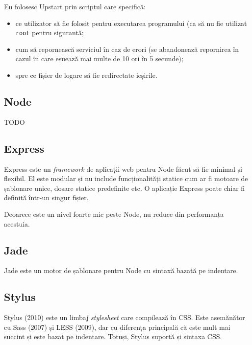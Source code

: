\documentclass[a4wide,12pt]{report}
\newcommand{\eng}[1]{\emph{#1}} %
\newcommand{\cod}[1]{\texttt{#1}}
\newcommand{\idee}[1]{{\color{red} #1}}
\begin{document}
Eu folosesc Upstart prin scriptul care specifică:

\begin{itemize}

\item ce utilizator să fie folosit pentru executarea programului (ca să nu fie
utilizat \cod{root} pentru sigurantă;

\item cum să repornească serviciul în caz de erori (se abandonează repornirea în
cazul în care eșuează mai multe de 10 ori în 5 secunde);

\item spre ce fișier de logare să fie redirectate ieșirile.

\end{itemize}

\subsection{Node}

\idee{TODO}

\subsection{Express}

Express este un \eng{framework} de aplicații web pentru Node făcut să fie
minimal și flexibil. El este modular și nu include funcționalități statice cum
ar fi motoare de șablonare unice, dosare statice predefinite etc. O aplicație
Express poate chiar fi definită într-un singur fișier.

Deoarece este un nivel foarte mic peste Node, nu reduce din performanța
acestuia.

\subsection{Jade}

Jade este un motor de șablonare pentru Node cu sintaxă bazată pe indentare.

\subsection{Stylus}

Stylus (2010) este un limbaj \eng{stylesheet} care compilează în CSS. Este
asemănător cu Sass (2007) și LESS (2009), dar cu diferența principală că este
mult mai succint și este bazat pe indentare. Totuși, Stylus suportă și sintaxa
CSS.
\end{document}
